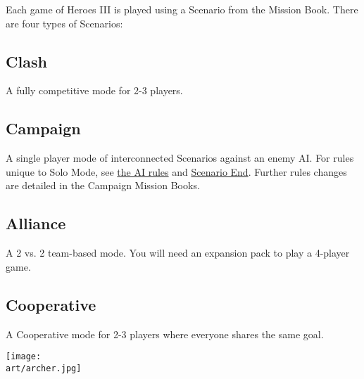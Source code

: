 
\begin{multicols*}{2}

Each game of Heroes III is played using a Scenario from the Mission Book.
There are four types of Scenarios:

\subsection*{Clash}
A fully competitive mode for 2-3 players.

\subsection*{Campaign}
A single player mode of interconnected Scenarios against an enemy AI.
For rules unique to Solo Mode, see \hyperlink{AIrules}{the AI rules} and \hyperlink{End}{Scenario End}.
Further rules changes are detailed in the Campaign Mission Books.

\subsection*{Alliance}
A 2 vs. 2 team-based mode.
You will need an expansion pack to play a 4-player game.

\subsection*{Cooperative}
A Cooperative mode for 2-3 players where everyone shares the same goal.

\vspace*{\fill}

\columnbreak

\texttt{[image: \\art/archer.jpg]}

\end{multicols*}
